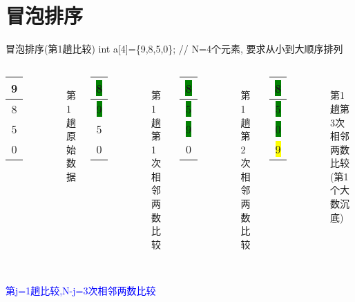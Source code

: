 \section{冒泡排序}

\begin{frame}{冒泡排序(第1趟比较)}
int a[4]=\{9,8,5,0\}; // N=4个元素, 要求从小到大顺序排列
\begin{columns}[T]
	\begin{tabular}{|c|}
		\hline 
		9 \\ 
		\hline 
		8 \\ 
		\hline 
		5 \\ 
		\hline
		0 \\
	    \hline 
	\end{tabular}\\ 
    第1趟原始数据
	\pause
	\begin{tabular}{|c|}
		\hline 
		\colorbox{green}{8} \\ 
		\hline 
		\colorbox{green}{9} \\ 
		\hline 
		5 \\ 
		\hline
		0 \\
		\hline  
	\end{tabular}\\ 
    第1趟第1次相邻两数比较
    \pause
    \begin{tabular}{|c|}
    	\hline 
    	\colorbox{green}{8} \\ 
    	\hline 
    	\colorbox{green}{5} \\ 
    	\hline 
    	\colorbox{green}{9} \\ 
    	\hline 
    	0 \\
    	\hline 
    \end{tabular}\\ 
    第1趟第2次相邻两数比较
    \pause
    \begin{tabular}{|c|}
    	\hline 
    	\colorbox{green}{8} \\ 
    	\hline 
    	\colorbox{green}{5} \\ 
    	\hline 
    	\colorbox{green}{0} \\ 
    	\hline 
    	\colorbox{yellow}{9} \\
    	\hline 
    \end{tabular}\\ 
    第1趟第3次相邻两数比较(第1个大数沉底)
\end{columns}
~\\
\textcolor{blue}{第j=1趟比较,N-j=3次相邻两数比较}
\end{frame}

